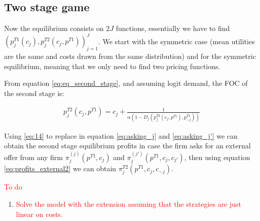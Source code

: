 \documentclass[12pt]{article}
\begin{document}
\subsection{Two stage game}

Now the equilibrium consists on $2J$ functions, essentially we have to find $(p_j^{T1}(c_j), p_j^{T2}(c_j, p^{T1}))_{j=1}^J$. We start with the symmetric case (mean utilities are the same and costs drawn from the same distribution) and for the symmetric equilibrium, meaning that we only need to find two pricing functions.


From equation \ref{eq:eq_second_stage}, and assuming logit demand, the FOC of the second stage is:


\begin{align}\label{eq:14}
    p_j^{T2}(c_j, p^{T1}) = c_j+\frac{1}{\alpha   (1 -D_j(p_j^{T2}(c_j, p^{T1}), p_{-j}^{T1}))}  
\end{align}

Using \ref{eq:14} to replace in equation \ref{eq:asking_j} and \ref{eq:asking_j'} we can obtain the second stage equilibrium profits in case the firm asks for an external offer from any firm $\pi_j^{(j)}(p^{T1}, c_j)$ and $\pi_j^{(j')}(p^{T1}, c_j, c_{j'})$, then using equation \ref{eq:profits_external2} we can obtain $\pi_j^{T2}(p^{T1}, c_j, c_{-j})$. 
 

\newpage



\textcolor{red}{To do}
\begin{enumerate}
    \item \textcolor{red}{Solve the model with the extension assuming that the strategies are just linear on costs. }
\end{enumerate}
 
\end{document}

